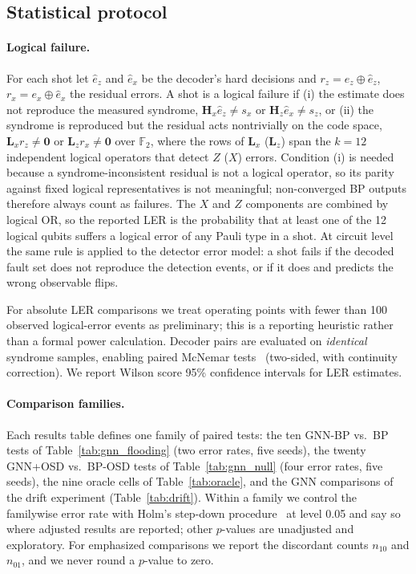 \documentclass[a4paper,twocolumn,11pt,nopdfoutputerror]{quantumarticle}
\newcommand{\F}{\mathbb{F}}
\newcommand{\Hmat}{\mathbf{H}}
\begin{document}
\subsection{Statistical protocol}\label{sec:metrics}

\paragraph{Logical failure.} For each shot let $\hat{e}_z$ and
$\hat{e}_x$ be the decoder's hard decisions and $r_z=e_z\oplus\hat{e}_z$,
$r_x=e_x\oplus\hat{e}_x$ the residual errors. A shot is a logical failure
if (i) the estimate does not reproduce the measured syndrome,
$\Hmat_x\hat{e}_z\neq s_x$ or $\Hmat_z\hat{e}_x\neq s_z$, or (ii) the
syndrome is reproduced but the residual acts nontrivially on the code
space, $\mathbf{L}_x r_z\neq\mathbf{0}$ or $\mathbf{L}_z r_x\neq\mathbf{0}$
over $\F_2$, where the rows of $\mathbf{L}_x$ ($\mathbf{L}_z$) span the
$k=12$ independent logical operators that detect $Z$ ($X$) errors.
Condition (i) is needed because a syndrome-inconsistent residual is not a
logical operator, so its parity against fixed logical representatives is
not meaningful; non-converged BP outputs therefore always count as
failures. The $X$ and $Z$ components are combined by logical OR, so the
reported LER is the probability that at least one of the 12 logical
qubits suffers a logical error of any Pauli type in a shot. At circuit
level the same rule is applied to the detector error model: a shot fails
if the decoded fault set does not reproduce the detection events, or if
it does and predicts the wrong observable flips.

For absolute LER comparisons we treat operating points with fewer than
100 observed logical-error events as preliminary; this is a reporting
heuristic rather than a formal power calculation. Decoder pairs are
evaluated on \emph{identical} syndrome samples, enabling paired
McNemar tests~\cite{McNemar1947} (two-sided, with continuity
correction). We report Wilson score 95\% confidence intervals for LER
estimates.

\paragraph{Comparison families.} Each results table defines one family
of paired tests: the ten GNN-BP vs.\ BP tests of
Table~\ref{tab:gnn_flooding} (two error rates, five seeds), the twenty
GNN+OSD vs.\ BP-OSD tests of Table~\ref{tab:gnn_null} (four error rates,
five seeds), the nine oracle cells of Table~\ref{tab:oracle}, and the GNN
comparisons of the drift experiment (Table~\ref{tab:drift}). Within a
family we control the familywise error rate with Holm's step-down
procedure~\cite{Holm1979} at level 0.05 and say so where adjusted results
are reported; other $p$-values are unadjusted and exploratory. For
emphasized comparisons we report the discordant counts $n_{10}$ and
$n_{01}$, and we never round a $p$-value to zero.
\end{document}

